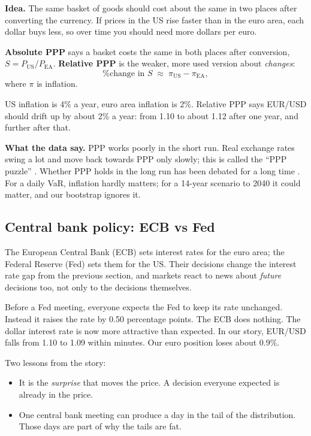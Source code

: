\documentclass[11pt,a4paper]{article}
\begin{document}
\textbf{Idea.} The same basket of goods should cost about the same in two
places after converting the currency. If prices in the US rise faster than
in the euro area, each dollar buys less, so over time you should need more
dollars per euro.

\textbf{Absolute PPP} says a basket costs the same in both places after
conversion, $S = P_{\text{US}} / P_{\text{EA}}$. \textbf{Relative PPP} is the
weaker, more used version about \emph{changes}:
\[
  \text{\% change in } S \;\approx\; \pi_{\text{US}} - \pi_{\text{EA}},
\]
where $\pi$ is inflation.

\begin{fictive}
US inflation is 4\% a year, euro area inflation is 2\%. Relative PPP says
EUR/USD should drift up by about 2\% a year: from 1.10 to about 1.12 after
one year, and further after that.
\end{fictive}

\textbf{What the data say.} PPP works poorly in the short run. Real exchange
rates swing a lot and move back towards PPP only slowly; this is called the
``PPP puzzle'' \citep{rogoff1996}. Whether PPP holds in the long run has
been debated for a long time \citep{taylortaylor2004}. For a daily VaR,
inflation hardly matters; for a 14-year scenario to 2040 it could matter,
and our bootstrap ignores it.

\subsection{Central bank policy: ECB vs Fed}

The European Central Bank (ECB) sets interest rates for the euro area; the
Federal Reserve (Fed) sets them for the US. Their decisions change the
interest rate gap from the previous section, and markets react to news
about \emph{future} decisions too, not only to the decisions themselves.

\begin{fictive}
Before a Fed meeting, everyone expects the Fed to keep its rate unchanged.
Instead it raises the rate by 0.50 percentage points. The ECB does nothing.
The dollar interest rate is now more attractive than expected. In our story,
EUR/USD falls from 1.10 to 1.09 within minutes. Our euro position loses
about 0.9\%.
\end{fictive}

Two lessons from the story:
\begin{itemize}
  \item It is the \emph{surprise} that moves the price. A decision everyone
    expected is already in the price.
  \item One central bank meeting can produce a day in the tail of the
    distribution. Those days are part of why the tails are fat.
\end{itemize}
\end{document}
